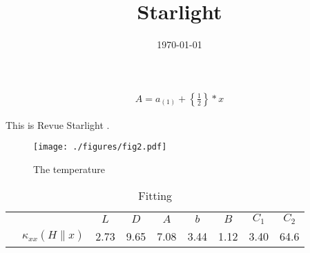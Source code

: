 \documentclass[
 reprint,
 aps,
 prl,
 superscriptaddress,
 amsmath,
 amssymb,
 floatfix
]{revtex4-2}
\begin{document}
\title{Starlight}
\date{\today}

\maketitle
\onecolumngrid

\begin{align}
    A = a_{\left(1\right)} + \left\{\frac{1}{2}\right\}*x
\end{align}

This is Revue Starlight \cite{Furukawa_TV_2018,Furukawa_RRR_2020,Aijo_gekisu_2021,Furukawa_MoR_2023}.
\begin{figure}[t]
    \centering
    \texttt{[image: ./figures/fig2.pdf]}
    \caption{
        The temperature 
    }
    \label{kappa_vs_TH_y_CTOCNO}
\end{figure}

\begin{table}[htb]
    \begin{center}
        \caption{Fitting}
        \begin{tabular}{|c|c|ccccccc|} \hline
                & & $L$ & $D$ & $A$ & $b$ & $B$ & $C_1$ & $C_2$ \\ 
                & $\kappa_{xx}(H\parallel x)$ & 2.73 & 9.65 & 7.08 & 3.44 & 1.12 & 3.40 & 64.6 \\
        \end{tabular}\label{table:parameters}
    \end{center}
\end{table}



\end{document}
